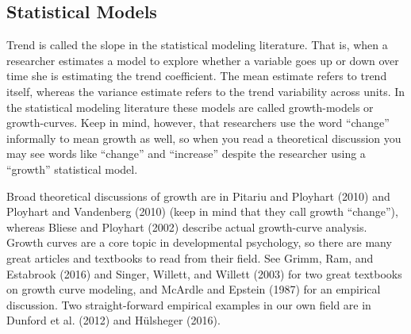 \documentclass[english,,man]{apa6}
\theoremstyle{definition}
\theoremstyle{definition}
\theoremstyle{definition}
\theoremstyle{remark}
\begin{document}
\hypertarget{statistical-models}{%
\subsection{Statistical Models}\label{statistical-models}}

Trend is called the slope in the statistical modeling literature. That
is, when a researcher estimates a model to explore whether a variable
goes up or down over time she is estimating the trend coefficient. The
mean estimate refers to trend itself, whereas the variance estimate
refers to the trend variability across units. In the statistical
modeling literature these models are called growth-models or
growth-curves. Keep in mind, however, that researchers use the word
\enquote{change} informally to mean growth as well, so when you read a
theoretical discussion you may see words like \enquote{change} and
\enquote{increase} despite the researcher using a \enquote{growth}
statistical model.

Broad theoretical discussions of growth are in Pitariu and Ployhart
(2010) and Ployhart and Vandenberg (2010) (keep in mind that they call
growth \enquote{change}), whereas Bliese and Ployhart (2002) describe
actual growth-curve analysis. Growth curves are a core topic in
developmental psychology, so there are many great articles and textbooks
to read from their field. See Grimm, Ram, and Estabrook (2016) and
Singer, Willett, and Willett (2003) for two great textbooks on growth
curve modeling, and McArdle and Epstein (1987) for an empirical
discussion. Two straight-forward empirical examples in our own field are
in Dunford et al. (2012) and Hülsheger (2016).
\end{document}
